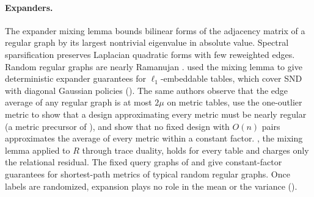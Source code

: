 \paragraph{Expanders.}
The expander mixing lemma \citep{alon1988explicit,hoory2006expander} bounds
bilinear forms of the adjacency matrix of a regular graph by its largest
nontrivial eigenvalue in absolute value. Spectral sparsification
\citep{spielman2011graph} preserves Laplacian quadratic forms with few reweighted
edges. Random regular graphs are nearly Ramanujan
\citep{friedman2008proof,bordenave2020new}. \citet{barhum2007approximating} used the mixing lemma to give deterministic expander
guarantees for $\ell_1$-embeddable tables, which cover SND with diagonal
Gaussian policies (). The same authors observe that the edge
average of any regular graph is at most $2\mu$ on metric tables, use the
one-outlier metric to show that a design approximating every metric must be
nearly regular (a metric precursor of ), and
show that no fixed design with $O(n)$ pairs approximates the average of
every metric within a constant factor. , the
mixing lemma applied to $R$ through trace duality, holds for every table and
charges only the relational residual. The fixed query graphs of
\citet{mendel2015expanders} and \citet{eskenazis2026optimal} give
constant-factor guarantees for shortest-path metrics of typical random
regular graphs. Once labels are randomized, expansion plays no role in the mean or the
variance ().
